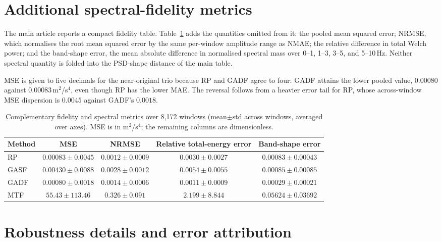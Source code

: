 \documentclass[10pt,a4paper,parskip=half-]{scrartcl}
\begin{document}
\FloatBarrier

\section{Additional spectral-fidelity metrics}

The main article reports a compact fidelity table. Table~\ref{tab:supp_spectral_energy} adds the quantities omitted from it: the pooled mean squared error; NRMSE, which normalises the root mean squared error by the same per-window amplitude range as NMAE; the relative difference in total Welch power; and the band-shape error, the mean absolute difference in normalised spectral mass over 0--1, 1--3, 3--5, and 5--10\,Hz. Neither spectral quantity is folded into the PSD-shape distance of the main table.

MSE is given to five decimals for the near-original trio because RP and GADF agree to four: GADF attains the lower pooled value, \(0.00080\) against \(0.00083\)\,m\(^2\)/s\(^4\), even though RP has the lower MAE. The reversal follows from a heavier error tail for RP, whose across-window MSE dispersion is \(0.0045\) against GADF's \(0.0018\).

\begin{table}[H]
\centering
\caption{Complementary fidelity and spectral metrics over 8,172 windows (mean$\pm$std across windows, averaged over axes). MSE is in m$^2$/s$^4$; the remaining columns are dimensionless.}
\label{tab:supp_spectral_energy}
\begin{tabular}{lcccc}
\toprule
Method & MSE & NRMSE & Relative total-energy error & Band-shape error \\
\midrule
RP   & $0.00083\pm0.0045$ & $0.0012\pm0.0009$ & $0.0030\pm0.0027$ & $0.00083\pm0.00043$ \\
GASF & $0.00430\pm0.0088$ & $0.0028\pm0.0012$ & $0.0054\pm0.0055$ & $0.00085\pm0.00085$ \\
GADF & $0.00080\pm0.0018$ & $0.0014\pm0.0006$ & $0.0011\pm0.0009$ & $0.00029\pm0.00021$ \\
MTF  & $55.43\pm113.46$   & $0.326\pm0.091$   & $2.199\pm8.844$   & $0.05624\pm0.03692$ \\
\bottomrule
\end{tabular}
\end{table}

\section{Robustness details and error attribution}
\label{sec:supp_robustness}
\end{document}
